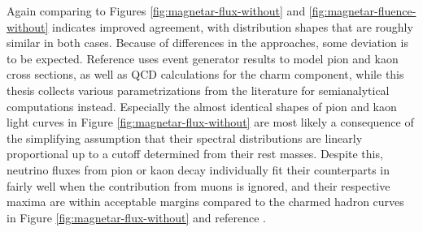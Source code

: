 Again comparing \cite{Carpio_2020} to Figures \ref{fig:magnetar-flux-without} and \ref{fig:magnetar-fluence-without} indicates improved
agreement, with distribution shapes that are roughly similar in both cases. Because of differences in the approaches, some deviation is
to be expected. Reference \cite{Carpio_2020} uses event generator results to model pion and kaon cross sections, as well as QCD calculations
for the charm component, while this thesis collects various parametrizations from the literature for semianalytical computations instead.
Especially the almost identical shapes of pion and kaon light curves in Figure \ref{fig:magnetar-flux-without} are most likely a consequence
of the simplifying assumption that their spectral distributions are linearly proportional up to a cutoff determined from their rest
masses. Despite this, neutrino fluxes from pion or kaon decay individually fit their counterparts in \cite{Carpio_2020} fairly well when
the contribution from muons is ignored, and their respective maxima are within acceptable margins compared to the charmed hadron curves in
Figure \ref{fig:magnetar-flux-without} and reference \cite{Carpio_2020}.

\newpage\null\vfill

\vfill\null\newpage\null\vfill

\vfill\null\newpage\null\vfill

\vfill\null\newpage

